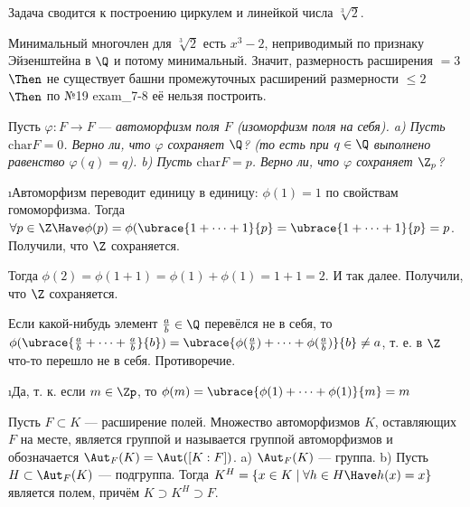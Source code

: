 \begin{solution}
Задача сводится к построению циркулем и линейкой числа \(\sqrt[3]{2}\).

Минимальный многочлен для $\sqrt[3]{2}$ есть $x^3 - 2$, неприводимый по признаку Эйзенштейна в $\Q$ и потому минимальный.
Значит, размерность расширения $= 3$ $\Then$ не существует башни промежуточных расширений размерности $\le 2$ $\Then$ по №19 exam\_7-8 её нельзя построить.

\end{solution}

\begin{problem}[40 (10.2)]
Пусть $\varphi: F \to F$ --- \it{автоморфизм поля} $F$ (изоморфизм поля на себя). 
a) Пусть $\mathrm{char} F =0$. Верно ли, что $\varphi$ сохраняет $\Q$? (то есть при $q\in\Q$ выполнено равенство $\varphi(q)=q$).
b) Пусть $\mathrm{char} F =p$. Верно ли, что $\varphi$ сохраняет $\Z_p$?
\end{problem}

\begin{solution}
\begin{enumerate}
\def\labelenumi{\alph{enumi})}
\i Автоморфизм переводит единицу в единицу: \(\phi(1) = 1\) по свойствам гомоморфизма.
Тогда \(\forall p \in \Z \Have \phi(p) = \phi(\ubrace{1+\dots+1}{p} = \ubrace{1+\dots+1}{p} = p\). Получили, что \(\Z\) сохраняется.

Тогда $\phi(2) = \phi(1+1) = \phi(1)+\phi(1)=1+1=2$.
И так далее. Получили, что $\Z$ сохраняется.

Если какой-нибудь элемент $\frac{a}{b} \in \Q$ перевёлся не в себя, то $\phi(\ubrace{\frac{a}{b}+\dots+\frac{a}{b}}{b}) = \ubrace{\phi(\frac{a}{b})+\dots+\phi(\frac{a}{b})}{b} \ne a$, т. е. в $\Z$ что-то перешло не в себя. Противоречие.
%

\i Да, т. к. если \(m \in \Zp\), то \(\phi(m) = \ubrace{\phi(1)+\dots+\phi(1)}{m} = m\)
\end{enumerate}
\end{solution}

\begin{problem}
Пусть $F \subset K$ — расширение полей. Множество автоморфизмов $K$, оставляющих $F$ на месте, является группой и называется группой автоморфизмов и обозначается $\Aut_F(K) = \Aut([K : F])$.
a) $\Aut_F(K)$ — группа.
b) Пусть $H \subset \Aut_F(K)$ --- подгруппа. Тогда $K^H = \{x \in K \mid \forall h \in H \Have h(x) = x\}$ является полем, причём $K \supset K^H \supset F$.
\end{problem}

